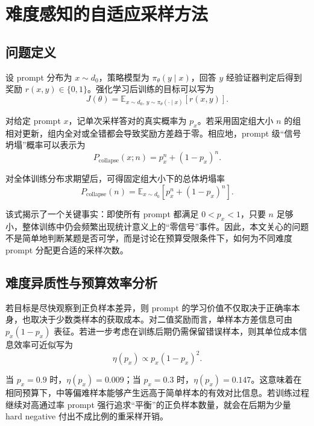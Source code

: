 \chapter{难度感知的自适应采样方法}\label{chap:method}

\section{问题定义}

设 prompt 分布为 $x\sim d_0$，策略模型为 $\pi_{\theta}(y\mid x)$，回答 $y$ 经验证器判定后得到奖励 $r(x,y)\in\{0,1\}$。强化学习后训练的目标可以写为
\begin{equation}
    J(\theta)=\mathbb{E}_{x\sim d_0,\,y\sim\pi_{\theta}(\cdot\mid x)}[r(x,y)].
\end{equation}

对给定 prompt $x$，记单次采样答对的真实概率为 $p_x$。若采用固定组大小 $n$ 的组相对更新，组内全对或全错都会导致奖励方差趋于零。相应地，prompt 级“信号坍塌”概率可以表示为
\begin{equation}
    P_{\mathrm{collapse}}(x;n)=p_x^n+(1-p_x)^n.
\end{equation}

对全体训练分布求期望后，可得固定组大小下的总体坍塌率
\begin{equation}
    P_{\mathrm{collapse}}(n)=\mathbb{E}_{x\sim d_0}[p_x^n+(1-p_x)^n].
\end{equation}

该式揭示了一个关键事实：即使所有 prompt 都满足 $0<p_x<1$，只要 $n$ 足够小，整体训练中仍会频繁出现统计意义上的“零信号”事件。因此，本文关心的问题不是简单地判断某题是否可学，而是讨论在预算受限条件下，如何为不同难度 prompt 分配更合适的采样次数。

\section{难度异质性与预算效率分析}

若目标是尽快观察到正负样本差异，则 prompt 的学习价值不仅取决于正确率本身，也取决于少数类样本的获取成本。对二值奖励而言，单样本方差信息可由 $p_x(1-p_x)$ 表征。若进一步考虑在训练后期仍需保留错误样本，则其单位成本信息效率可近似写为
\begin{equation}
    \eta(p_x)\propto p_x(1-p_x)^2.
\end{equation}

当 $p_x=0.9$ 时，$\eta(p_x)=0.009$；当 $p_x=0.3$ 时，$\eta(p_x)=0.147$。这意味着在相同预算下，中等偏难样本能够产生远高于简单样本的有效对比信息。若训练过程继续对高通过率 prompt 强行追求“平衡”的正负样本数量，就会在后期为少量 hard negative 付出不成比例的重采样开销。

